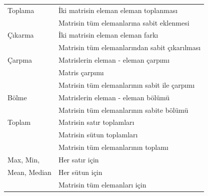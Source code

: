 \begin{longtable}{p{80pt} p{250pt}}
\hline \hline
\endlastfoot
 Toplama 								& İki matrisin eleman eleman toplanması 											\\%
 												& Matrisin tüm elemanlarına sabit eklenmesi										\\%
 Çıkarma 								& İki matrisin eleman eleman farkı 														\\%
 												& Matrisin tüm elemanlarından sabit çıkarılması 							\\%
 Çarpma									& Matrislerin eleman - eleman çarpımı 												\\%
 												& Matris çarpımı 																							\\%
 												& Matrisin tüm elemanlarının sabit ile çarpımı				 				\\%
 Bölme									& Matrislerin eleman - eleman bölümü 													\\%
 												& Matrisin tüm elemanlarının sabite bölümü 						 				\\%
 Toplam									& Matrisin satır toplamları 																	\\%
 												& Matrisin sütun toplamları				 														\\%
 												& Matrisin tüm elemanlarının toplamı 													\\%
 Max, Min,  						& Her satır için																							\\%
 Mean, Median						& Her sütun için																							\\%
 												& Matrisin tüm elemanları için																\\%

\end{longtable}
